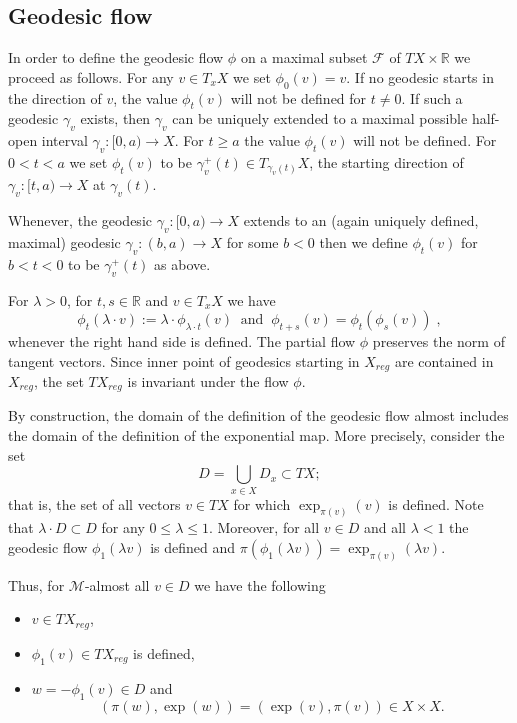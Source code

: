 \documentclass[12pt,leqno]{amsart}
\numberwithin{equation}{section}
\theoremstyle{definition}
\theoremstyle{remark}
\newcommand{\R}{\mathbb{R}}
\def\:{\colon}
\begin{document}
\subsection{Geodesic flow}
   In order to define the geodesic flow $\phi$ on a maximal subset   $\mathcal F$ of $TX \times \R $  we proceed as follows.
 For any  $v\in  T_xX$ we set $\phi _0(v)=v$.
 If no geodesic starts in the direction of $v$,
 the value $\phi _t(v)$ will not be defined for $t\neq 0$. If such a geodesic $\gamma_v$ exists, then $\gamma_v$   can be uniquely extended to a maximal possible half-open  interval $\gamma_v \:[0,a)\to X$.  For $t\geq a$
 the value $\phi _t(v)$ will not be defined. For $0<t<a$ we set $\phi _t(v)$ to be $\gamma _v ^+ (t) \in T_{\gamma _v(t)} X$, the starting direction of $\gamma_v\:[t,a) \to X$ at $\gamma_v (t)$.

 Whenever, the geodesic $\gamma _v\:[0,a)\to X$ extends to an (again uniquely defined, maximal)  geodesic   $\gamma_v\:(b,a) \to X$ for some $b<0$
 then we define $\phi _t(v)$ for $b<t<0$ to be $\gamma_v ^+ (t) $ as above.


For $\lambda >0$, for $t,s\in \R$  and $v\in  T_x X$ we have
 $$\phi _t(\lambda \cdot  v) :=\lambda \cdot \phi _{\lambda  \cdot t} (v) \; \;  \text{and}  \;  \;   \phi _{t+s} (v) =\phi _t ( \phi _s (v)) \; ,$$
 whenever the right hand side is defined.
The partial flow $\phi$ preserves the norm of tangent vectors.  Since inner point of geodesics starting in $X_{reg}$ are contained in $X_{reg}$, the set  $TX_{reg}$ is invariant under the  flow $\phi$.


By construction, the domain of the definition of the  geodesic flow almost includes the domain of the definition of the exponential map.
More precisely, consider the set
\[D=\bigcup_{x\in X} D_x\subset TX;\]
that is, the set of all vectors $v\in TX$ for which $\exp _{\pi(v)} (v)$ is defined.
Note that $\lambda\cdot D\subset D$ for any $0\leq \lambda \leq 1$.
Moreover, for all $v\in D$ and all $\lambda <1$
 the geodesic flow $\phi_1 (\lambda v)$ is defined and $\pi (\phi_1 (\lambda v))=  \exp _{\pi (v)} (\lambda v)$.


Thus,  for $\mathcal M$-almost all $v\in D$ we have the following
\begin{itemize}
\item $v\in TX_{reg}$,
\item $\phi _1(v) \in TX_{reg}$ is defined,
\item $w=-\phi_1 (v)\in D$ and
 \begin{equation} \label{eq:symm}
(\pi (w), \exp (w))=(\exp (v), \pi (v)) \in X\times X.
 \end{equation}
\end{itemize}
\end{document}
